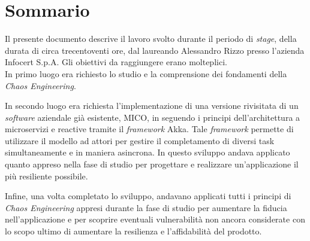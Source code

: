 
{}
{}
\begingroup
\let\clearpage\relax
\let\cleardoublepage\relax
\let\cleardoublepage\relax

\chapter*{Sommario}

Il presente documento descrive il lavoro svolto durante il periodo di \textit{stage}, della durata di circa trecentoventi ore, dal laureando Alessandro Rizzo presso l'azienda Infocert S.p.A.
Gli obiettivi da raggiungere erano molteplici.\\
In primo luogo era richiesto lo studio e la comprensione dei fondamenti della \textit{Chaos Engineering}.

In secondo luogo era richiesta l'implementazione di una versione rivisitata di un \textit{software} aziendale già esistente, MICO, in seguendo i principi dell'architettura a microservizi e reactive tramite il \textit{framework} Akka.
Tale \textit{framework} permette di utilizzare il modello ad attori per gestire il completamento di diversi task simultaneamente e in maniera asincrona.
In questo sviluppo andava applicato quanto appreso nella fase di studio per progettare e realizzare un'applicazione il più resiliente possibile.

Infine, una volta completato lo sviluppo, andavano applicati tutti i principi di \textit{Chaos Engineering} appresi durante la fase di studio per aumentare la fiducia nell'applicazione e per scoprire eventuali vulnerabilità non ancora considerate con lo scopo ultimo di aumentare la resilienza e l'affidabilità del prodotto.

%
%

\endgroup			

\vfill

